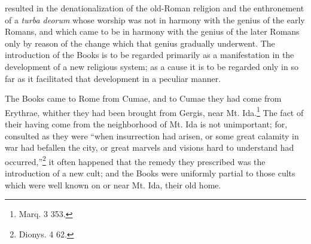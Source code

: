 \documentclass[a4paper, 11pt, oneside, polutonikogreek, english]{article}
\begin{document}
resulted in the denationalization of the old-Roman religion and the enthronement of a \emph{turba deorum} whose worship was not in harmony with the genius of the early Romans, and which came to be in harmony with the genius of the later Romans only by reason of the change which that genius gradually underwent. The introduction of the Books is to be regarded primarily as a manifestation in the development of a new religious system; as a cause it is to be regarded only in so far as it facilitated that development in a peculiar manner.

The Books came to Rome from Cumae, and to Cumae they had come from Erythrae, whither they had been brought from Gergis, near Mt. Ida.\footnote{Marq. 3 353.} The fact of their having come from the neighborhood of Mt. Ida is not unimportant; for, consulted as they were ``when insurrection had arisen, or some great calamity in war had befallen the city, or great marvels and visions hard to understand had occurred,''\footnote{Dionys. 4 62.} it often happened that the remedy they prescribed was the introduction of a new cult; and the Books were uniformly partial to those cults which were well known on or near Mt. Ida, their old home.
\end{document}
